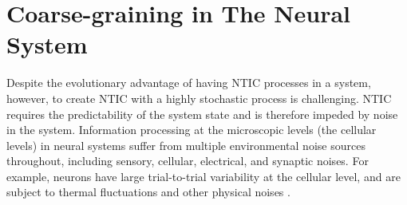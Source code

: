 \documentclass[utf8]{article}
\begin{document}


            
            


	\section{Coarse-graining in The Neural System} \label{sec:Neural coarse-graining}

		Despite the evolutionary advantage of having NTIC processes in a system, however, to create NTIC with a highly stochastic process is challenging. NTIC requires the predictability of the system state and is therefore impeded by noise in the system. Information processing at the microscopic levels (the cellular levels) in neural systems suffer from multiple environmental noise sources throughout, including sensory, cellular, electrical, and synaptic noises. For example, neurons have large trial-to-trial variability at the cellular level, and are subject to thermal fluctuations and other physical noises \citep{faisal2008noise}. 
		
\end{document}
